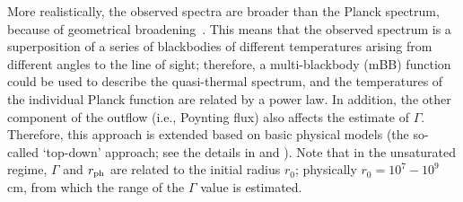 \documentclass[prd,twocolumn,amsmath,amssymb,aps,linenumbers]{revtex4-2} %
\begin{document}
More realistically, the observed spectra are broader than the Planck spectrum, because of geometrical broadening~\citep[e.g.][]{2008ApJ...682..463P}. This means that the observed spectrum is a superposition of a series of blackbodies of different temperatures arising from different angles to the line of sight; therefore, a multi-blackbody (mBB) function could be used to describe the quasi-thermal spectrum, and the
temperatures of the individual Planck function are related
by a power law. In addition, the other component of the outflow (i.e., Poynting flux) also affects the estimate of $\Gamma$. Therefore, this approach is extended based on basic physical models (the so-called `top-down' approach; see the details in \citealt{2015ApJ...801..103G} and \citealt{2024ApJ...961..137S}). %
Note that in the unsaturated regime, $\Gamma$ and $r_{\rm ph}$ are related to the initial radius $r_0$; physically $r_0=10^7 - 10^9$ cm, from which the range of the $\Gamma$ value is estimated.
\end{document}
